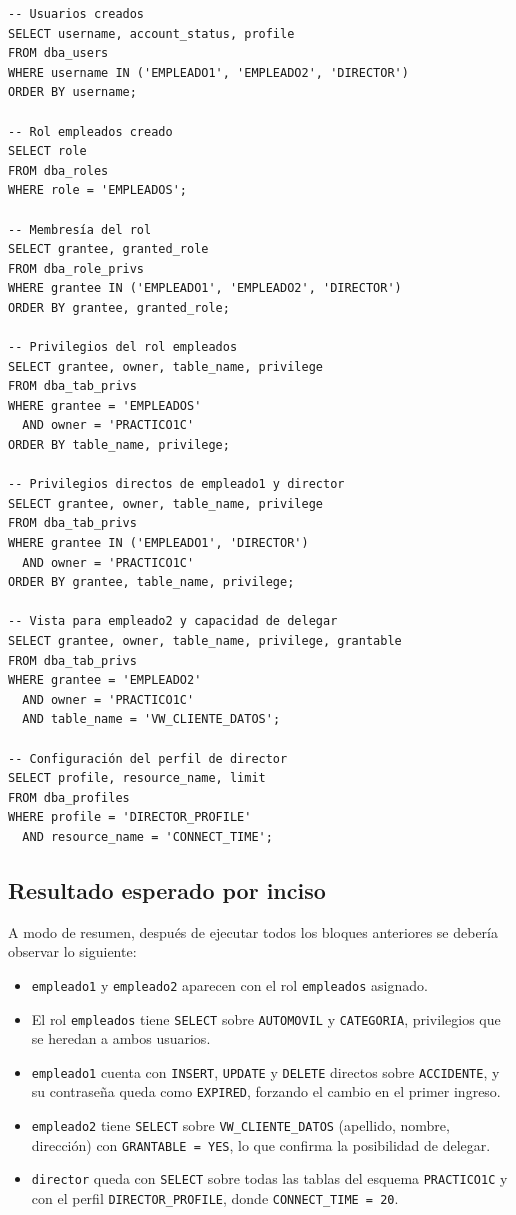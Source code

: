 \documentclass[11pt,a4paper]{article}
\begin{document}
\begin{lstlisting}
-- Usuarios creados
SELECT username, account_status, profile
FROM dba_users
WHERE username IN ('EMPLEADO1', 'EMPLEADO2', 'DIRECTOR')
ORDER BY username;

-- Rol empleados creado
SELECT role
FROM dba_roles
WHERE role = 'EMPLEADOS';

-- Membresía del rol
SELECT grantee, granted_role
FROM dba_role_privs
WHERE grantee IN ('EMPLEADO1', 'EMPLEADO2', 'DIRECTOR')
ORDER BY grantee, granted_role;

-- Privilegios del rol empleados
SELECT grantee, owner, table_name, privilege
FROM dba_tab_privs
WHERE grantee = 'EMPLEADOS'
  AND owner = 'PRACTICO1C'
ORDER BY table_name, privilege;

-- Privilegios directos de empleado1 y director
SELECT grantee, owner, table_name, privilege
FROM dba_tab_privs
WHERE grantee IN ('EMPLEADO1', 'DIRECTOR')
  AND owner = 'PRACTICO1C'
ORDER BY grantee, table_name, privilege;

-- Vista para empleado2 y capacidad de delegar
SELECT grantee, owner, table_name, privilege, grantable
FROM dba_tab_privs
WHERE grantee = 'EMPLEADO2'
  AND owner = 'PRACTICO1C'
  AND table_name = 'VW_CLIENTE_DATOS';

-- Configuración del perfil de director
SELECT profile, resource_name, limit
FROM dba_profiles
WHERE profile = 'DIRECTOR_PROFILE'
  AND resource_name = 'CONNECT_TIME';
\end{lstlisting}

\subsection{Resultado esperado por inciso}

A modo de resumen, después de ejecutar todos los bloques anteriores se debería observar lo siguiente:

\begin{itemize}
    \item \texttt{empleado1} y \texttt{empleado2} aparecen con el rol \texttt{empleados} asignado.
    \item El rol \texttt{empleados} tiene \texttt{SELECT} sobre \texttt{AUTOMOVIL} y \texttt{CATEGORIA}, privilegios que se heredan a ambos usuarios.
    \item \texttt{empleado1} cuenta con \texttt{INSERT}, \texttt{UPDATE} y \texttt{DELETE} directos sobre \texttt{ACCIDENTE}, y su contraseña queda como \texttt{EXPIRED}, forzando el cambio en el primer ingreso.
    \item \texttt{empleado2} tiene \texttt{SELECT} sobre \texttt{VW\_CLIENTE\_DATOS} (apellido, nombre, dirección) con \texttt{GRANTABLE = YES}, lo que confirma la posibilidad de delegar.
    \item \texttt{director} queda con \texttt{SELECT} sobre todas las tablas del esquema \texttt{PRACTICO1C} y con el perfil \texttt{DIRECTOR\_PROFILE}, donde \texttt{CONNECT\_TIME = 20}.
\end{itemize}
\end{document}
